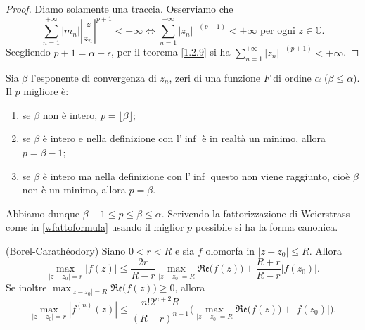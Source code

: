 \begin{proof}
  Diamo solamente una traccia. Osserviamo che
  $$\sum_{n=1}^{+\infty} |m_n|\left|\frac{z}{z_n}\right|^{p+1}<+\infty \iff \sum_{n=1}^{+\infty} |z_n|^{-(p+1)}<+\infty\text{ per ogni }z \in \mathbb{C}.$$
  Scegliendo $p+1=\alpha+\epsilon$, per il teorema \ref{1.2.9} si ha $\displaystyle \sum_{n=1}^{+\infty} |z_n|^{-(p+1)}<+\infty$.
\end{proof}

\begin{oss}
  Sia $\beta$ l'esponente di convergenza di $z_n$, zeri di una funzione $F$ di ordine $\alpha$ ($\beta \le \alpha$). Il $p$ migliore è:
  \begin{enumerate}
    \item se $\beta$ non è intero, $p=\lfloor\beta\rfloor$;
    \item se $\beta$ è intero e nella definizione con l'$\inf$ è in realtà un minimo, allora $p=\beta-1$;
    \item se $\beta$ è intero ma nella definizione con l'$\inf$ questo non viene raggiunto, cioè $\beta$ non è un minimo, allora $p=\beta$.
  \end{enumerate}
  Abbiamo dunque $\beta-1 \le p \le \beta \le \alpha$. Scrivendo la fattorizzazione di Weierstrass come in \eqref{wfattoformula} usando il miglior $p$ possibile si ha la forma canonica.
\end{oss}

\begin{thm}
  (Borel-Carathéodory) Siano $0<r<R$ e sia $f$ olomorfa in $|z-z_0| \le R$. Allora
  \begin{equation*}
    \max_{|z-z_0|=r}|f(z)| \le \frac{2r}{R-r}\max_{|z-z_0|=R}\mathfrak{Re}\big(f(z)\big)+\frac{R+r}{R-r}|f(z_0)|.
  \end{equation*}
  Se inoltre $\displaystyle \max_{|z-z_0|=R}\mathfrak{Re}\big(f(z)\big) \ge 0$, allora
  \begin{equation*}
    \max_{|z-z_0|=r}|f^{(n)}(z)| \le \frac{n!2^{n+2}R}{(R-r)^{n+1}}\Big(\max_{|z-z_0|=R}\mathfrak{Re}\big(f(z)\big)+|f(z_0)|\Big).
  \end{equation*}
\end{thm}

